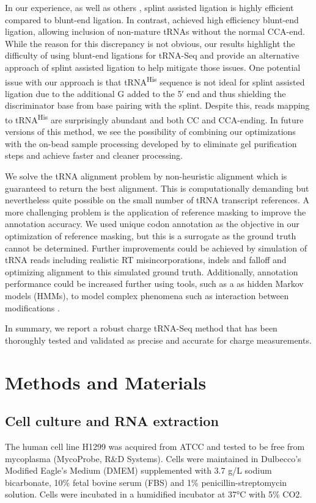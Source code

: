 \documentclass[9pt,lineno]{elife}
\begin{document}
In our experience, as well as others \citep{Shigematsu2017-tv}, splint assisted ligation is highly efficient compared to blunt-end ligation.
In contrast, \cite{Behrens2021-gb} achieved high efficiency blunt-end ligation, allowing inclusion of non-mature tRNAs without the normal CCA-end.
While the reason for this discrepancy is not obvious, our results highlight the difficulty of using blunt-end ligations for tRNA-Seq and provide an alternative approach of splint assisted ligation to help mitigate those issues.
One potential issue with our approach is that tRNA\textsuperscript{His} sequence is not ideal for splint assisted ligation due to the additional G added to the 5′ end \citep{Heinemann2012-hq} and thus shielding the discriminator base from base pairing with the splint.
Despite this, reads mapping to tRNA\textsuperscript{His} are surprisingly abundant and both CC and CCA-ending.
In future versions of this method, we see the possibility of combining our optimizations with the on-bead sample processing developed by \cite{Watkins2022-er} to eliminate gel purification steps and achieve faster and cleaner processing.

We solve the tRNA alignment problem by non-heuristic alignment which is guaranteed to return the best alignment.
This is computationally demanding but nevertheless quite possible on the small number of tRNA transcript references.
A more challenging problem is the application of reference masking to improve the annotation accuracy.
We used unique codon annotation as the objective in our optimization of reference masking, but this is a surrogate as the ground truth cannot be determined.
Further improvements could be achieved by simulation of tRNA reads including realistic RT misincorporations, indels and falloff and optimizing alignment to this simulated ground truth.
Additionally, annotation performance could be increased further using tools, such as a as hidden Markov models (HMMs), to model complex phenomena such as interaction between modifications \citep{Wang2021-fc, Hernandez-Alias2022-ch}.

In summary, we report a robust charge tRNA-Seq method that has been thoroughly tested and validated as precise and accurate for charge measurements.






\section{Methods and Materials}
\subsection{Cell culture and RNA extraction}
The human cell line H1299 was acquired from ATCC and tested to be free from mycoplasma (MycoProbe, R\&D Systems).
Cells were maintained in Dulbecco’s Modified Eagle’s Medium (DMEM) supplemented with 3.7 g/L sodium bicarbonate, 10\% fetal bovine serum (FBS) and 1\% penicillin-streptomycin solution.
Cells were incubated in a humidified incubator at 37°C with 5\% CO2.
\end{document}
